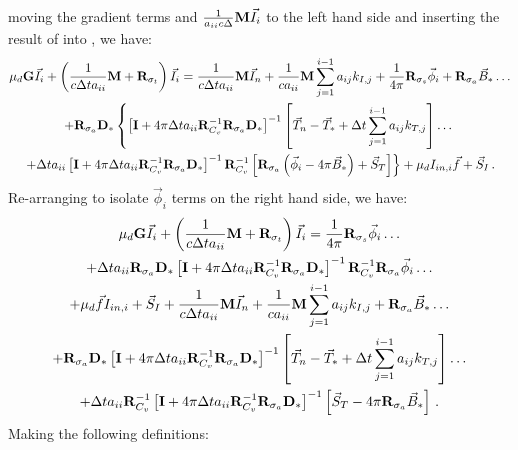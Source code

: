 %
%
moving the gradient terms and $\frac{1}{a_{ii} c \Delta }  \mathbf M \vec{I}_i$ to the left hand side and inserting the result of  into , we have:
%
%
\begin{multline}
\mu_d \mathbf{G} \vec{I}_i + \left( \frac{1}{c\Delta t a_{ii}} \mathbf M + \mathbf{R}_{\sigma_t} \right) \vec{I}_i = 
\frac{1}{c\Delta t a_{ii}} \mathbf M\vec{I}_n + \frac{1}{c a_{ii}}  \mathbf M \sum_{j=1}^{i-1}{a_{ij} k_{I,j}   } 
+ \frac{1}{4\pi}\mathbf{R}_{\sigma_s}\vec{\phi}_i 
+ \mathbf{R}_{\sigma_a}\vec{B}_* \dots \\ 
+ \mathbf{R}_{\sigma_a}  \mathbf{D}_*  \left \{
\left[ \mathbf{I}  + 4\pi \Delta t a_{ii}\mathbf{R}_{C_v}^{-1}\mathbf{R}_{\sigma_a} \mathbf{D}_*   \right]^{-1}
\left[\vec{T}_n -\vec{T}_* + \Delta t \sum_{j=1}^{i-1}{a_{ij} k_{T,j}   }\right]   \dots \right.  \\
\left.
+ \Delta t a_{ii}\left[ \mathbf{I} + 4\pi \Delta t a_{ii}\mathbf{R}_{C_v}^{-1} \mathbf{R}_{\sigma_a} \mathbf{D}_*   \right]^{-1} 
\mathbf{R}_{C_v}^{-1}\left[\mathbf{R}_{\sigma_a} \left(\vec{\phi}_i - 4\pi \vec{B}_*  \right) + \vec{S}_T \right]  \right \} + \mu_d I_{in,i} \vec{f} + \vec{S}_I \, .
\label{eq:intensity_stage_i_intermediate}
\end{multline}
%
%
Re-arranging  to isolate $\vec{\phi}_i$ terms on the right hand side, we have:
%
%
\begin{multline}
\mu_d \mathbf{G} \vec{I}_i + \left( \frac{1}{c\Delta t a_{ii}}\M + \R{\sigma_t} \right) \vec{I}_i =  \frac{1}{4\pi}\R{\sigma_s}\vec{\phi}_i \dots \\
%
%
+  \Delta t a_{ii} \R{\sigma_a} \D
\left[\I + 4\pi \Delta t a_{ii}\R{C_v}^{-1} \R{\sigma_a}\D  \right]^{-1}\R{C_v}^{-1}\R{\sigma_a}\vec{\phi}_i\dots \\
%
%
+ \mu_d \vec{f}I_{in,i} + \vec{S}_I +  \frac{1}{c\Delta t a_{ii}}\M\vec{I}_n + \frac{1}{c a_{ii}} \M \sum_{j=1}^{i-1}{a_{ij} k_{I,j}   } + \R{\sigma_a}\vec{B}_* \dots \\
%
%
+ \R{\sigma_a} \D
\left[\I+ 4\pi \Delta t a_{ii}\R{C_v}^{-1}\R{\sigma_a} \D\right]^{-1}
\left[ \vec{T}_n - \vec{T}_* + \Delta t \sum_{j=1}^{i-1}{a_{ij} k_{T,j}  }\right] \dots \\
  +\Delta t a_{ii}  \R{C_v}^{-1} \left[\I+ 4\pi \Delta t a_{ii}\R{C_v}^{-1}\R{\sigma_a} \D\right]^{-1} \left[\vec{S}_T - 4\pi\R{\sigma_a} \vec{B}_* \right] \pep
\end{multline}
Making the following definitions:
